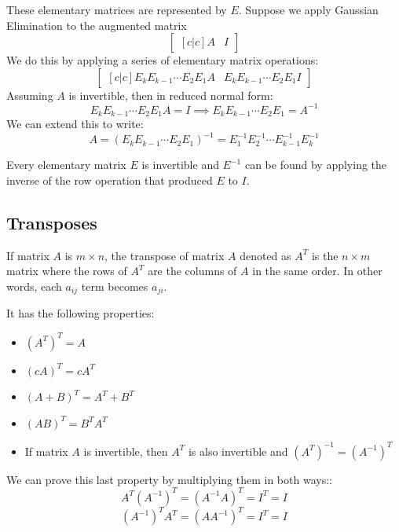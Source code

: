 \documentclass{article}
\begin{document}
These elementary matrices are represented by $E$. Suppose we apply Gaussian Elimination to the augmented matrix
\begin{equation}
    \begin{bmatrix}[c|c]
        A&I
    \end{bmatrix}
    \label{eq:}
\end{equation}
We do this by applying a series of elementary matrix operations:
\begin{equation}
\begin{bmatrix}[c|c]
    E_{k}E_{k-1}\cdots E_2E_1A &     E_{k}E_{k-1}\cdots E_2E_1I
\end{bmatrix}
\end{equation}
Assuming $A$ is invertible, then in reduced normal form:
\begin{equation}
    E_{k}E_{k-1}\cdots E_2E_1A  = I \implies E_{k}E_{k-1}\cdots E_2E_1 = A^{-1}
    \label{eq:}
\end{equation}
We can extend this to write:
\begin{equation}
    A = \left(E_{k}E_{k-1}\cdots E_2E_1\right)^{-1}=E_1^{-1}E_2^{-1}\cdots E_{k-1}^{-1}E_k^{-1}
    \label{eq:}
\end{equation}
\begin{theorem}
    Every elementary matrix $E$ is invertible and $E^{-1}$ can be found by applying the inverse of the row operation that produced $E$ to $I$.
\end{theorem}
\subsection{Transposes}
\begin{definition}
    If matrix $A$ is $m\times n$, the transpose of matrix $A$ denoted as $A^T$ is the $n\times m$ matrix where the rows of $A^T$ are the columns of $A$ in the same order. In other words, each $a_{ij}$ term becomes $a_{ji}$. 
\end{definition}
It has the following properties:
\begin{itemize}
    \item $\left(A^T\right)^T=A$
    \item $(cA)^T=cA^T$
    \item $(A+B)^T=A^T+B^T$
    \item $(AB)^T=B^TA^T$
    \item If matrix $A$ is invertible, then $A^T$ is also invertible and $\left(A^T\right)^{-1}=\left(A^{-1}\right)^{T}$
\end{itemize}
We can prove this last property by multiplying them in both ways::
\begin{equation}
    A^T\left(A^{-1}\right)^T = \left(A^{-1}A\right)^T = I^T = I
    \label{eq:}
\end{equation}
\begin{equation}
    \left(A^{-1}\right)^TA^T = \left(AA^{-1}\right)^T = I^T = I
    \label{eq:}
\end{equation}
\end{document}
